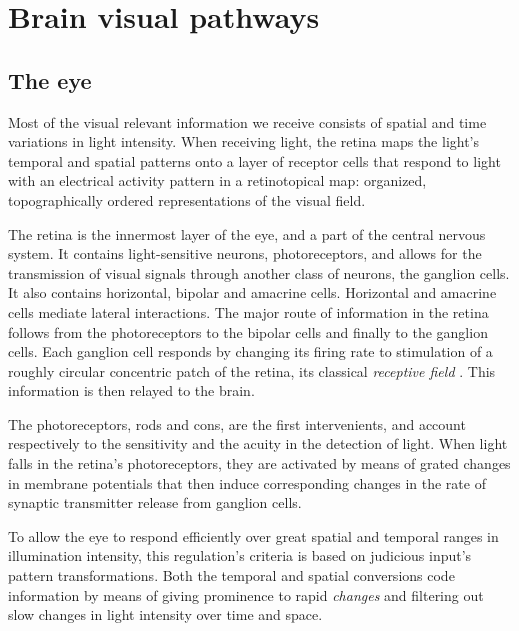 \section{Brain visual pathways}
\label{sec:sectionb}

\subsection{The eye}

Most of the visual relevant information we receive consists of spatial and time variations in light intensity. When receiving light, the retina maps the light's temporal and spatial patterns onto a layer of receptor cells that respond to light with an electrical activity pattern in a retinotopical map: organized, topographically ordered representations of the visual field.  

The retina is the innermost layer of the eye, and a part of the central nervous system. It contains light-sensitive neurons, photoreceptors, and allows for the transmission of visual signals through another class of neurons, the ganglion cells. It also contains horizontal, bipolar and amacrine cells. Horizontal and amacrine cells mediate lateral interactions. The major route of information in the retina follows from the photoreceptors to the bipolar cells and finally to the ganglion cells. Each ganglion cell responds by changing its firing rate to stimulation of a roughly circular concentric patch of the retina, its classical \textit{receptive field} \cite{1recfield}. This information is then relayed to the brain.

The photoreceptors, rods and cons, are the first intervenients, and account respectively to the sensitivity and the acuity in the detection of light.
When light falls in the retina's photoreceptors, they are activated by means of grated changes in membrane potentials that then induce corresponding changes in the rate of synaptic transmitter release from ganglion cells. 

To allow the eye to respond efficiently over great spatial and temporal ranges in illumination intensity, this regulation's criteria is based on judicious input's pattern transformations. Both the temporal and spatial conversions code information by means of giving prominence to rapid \textit{changes} and filtering out slow changes in light intensity over time and space.


